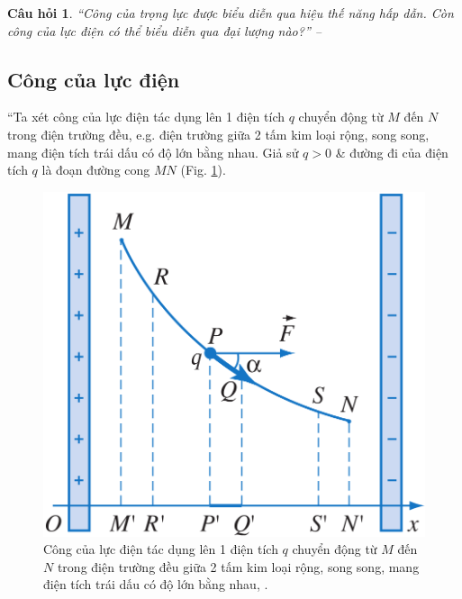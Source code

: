 \documentclass[oneside]{book}
\numberwithin{equation}{section}
\newtheorem{cauhoi}{Câu hỏi}[section]
\begin{document}
\begin{cauhoi}
	``Công của trọng lực được biểu diễn qua hiệu thế năng hấp dẫn. Còn công của lực điện có thể biểu diễn qua đại lượng nào?'' -- \cite[p. 19]{SGK_Vat_Ly_11_nang_cao}
\end{cauhoi}

\subsection{Công của lực điện}
``Ta xét công của lực điện tác dụng lên 1 điện tích $q$ chuyển động từ $M$ đến $N$ trong điện trường đều, e.g. điện trường giữa 2 tấm kim loại rộng, song song, mang điện tích trái dấu có độ lớn bằng nhau. Giả sử $q > 0$ \& đường đi của điện tích $q$ là đoạn đường cong $MN$ (Fig. \ref{fig:cong_luc_dien}).

\begin{figure}[H]
	\centering
	\includegraphics[scale=0.15]{cong_luc_dien}
	\caption{Công của lực điện tác dụng lên 1 điện tích $q$ chuyển động từ $M$ đến $N$ trong điện trường đều giữa 2 tấm kim loại rộng, song song, mang điện tích trái dấu có độ lớn bằng nhau, \cite[Hình 4.1, p. 19]{SGK_Vat_Ly_11_nang_cao}.}
	\label{fig:cong_luc_dien}
\end{figure}
\end{document}
